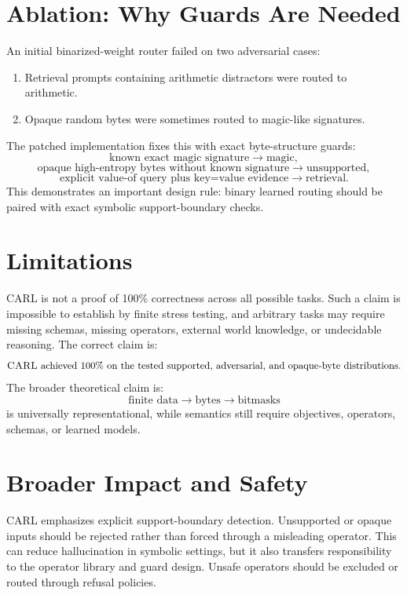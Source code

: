 \documentclass[10pt]{article}
\newcommand{\CARL}{\textsc{CARL}}
\begin{document}
\section{Ablation: Why Guards Are Needed}

An initial binarized-weight router failed on two adversarial cases:
\begin{enumerate}[leftmargin=1.5em]
  \item Retrieval prompts containing arithmetic distractors were routed to arithmetic.
  \item Opaque random bytes were sometimes routed to magic-like signatures.
\end{enumerate}
The patched implementation fixes this with exact byte-structure guards:
\[
\text{known exact magic signature} \rightarrow \text{magic},
\]
\[
\text{opaque high-entropy bytes without known signature} \rightarrow \text{unsupported},
\]
\[
\text{explicit value-of query plus key=value evidence} \rightarrow \text{retrieval}.
\]
This demonstrates an important design rule: binary learned routing should be paired with exact symbolic support-boundary checks.

\section{Limitations}

\CARL{} is not a proof of 100\% correctness across all possible tasks. Such a claim is impossible to establish by finite stress testing, and arbitrary tasks may require missing schemas, missing operators, external world knowledge, or undecidable reasoning. The correct claim is:
\[
\text{\CARL{} achieved 100\% on the tested supported, adversarial, and opaque-byte distributions.}
\]
The broader theoretical claim is:
\[
\text{finite data} \rightarrow \text{bytes} \rightarrow \text{bitmasks}
\]
is universally representational, while semantics still require objectives, operators, schemas, or learned models.

\section{Broader Impact and Safety}

\CARL{} emphasizes explicit support-boundary detection. Unsupported or opaque inputs should be rejected rather than forced through a misleading operator. This can reduce hallucination in symbolic settings, but it also transfers responsibility to the operator library and guard design. Unsafe operators should be excluded or routed through refusal policies.
\end{document}
